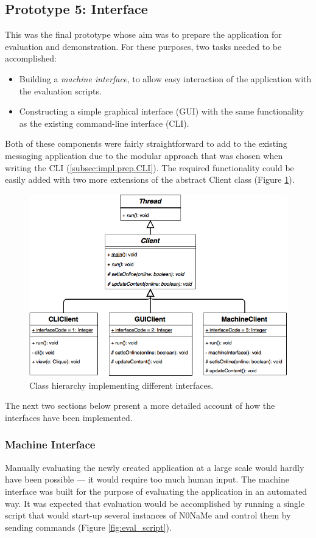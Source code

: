 \documentclass[a4paper, 12pt]{report}
\newcommand{\funkytt}{\fontfamily{AnonymousPro}\selectfont}
\begin{document}
\subsection{Prototype 5: Interface}
\label{subsec:impl.proto.interface}
This was the final prototype whose aim was to prepare the application for evaluation and demonstration. For these purposes, two tasks needed to be accomplished:
\begin{itemize}
    \item Building a \emph{machine interface}, to allow easy interaction of the application with the evaluation scripts.
    \item Constructing a simple graphical interface (GUI) with the same functionality as the existing command-line interface (CLI).
\end{itemize}

Both of these components were fairly straightforward to add to the existing messaging application due to the modular approach that was chosen when writing the CLI (\cref{subsec:impl.prep.CLI}). The required functionality could be easily added with two more extensions of the abstract Client class (Figure \ref{fig:Client_UI}).

\begin{figure}[H]
    \captionsetup{width=0.80\textwidth}
    \centering
    \includegraphics[width=0.76\linewidth]{pics/Client_UI.png}
    \caption{\label{fig:Client_UI} Class hierarchy implementing different interfaces.}
\end{figure}
The next two sections below present a more detailed account of how the interfaces have been implemented.

\subsubsection{Machine Interface}
Manually evaluating the newly created application at a large scale would hardly have been possible --- it would require too much human input. The machine interface was built for the purpose of evaluating the application in an automated way. It was expected that evaluation would be accomplished by running a single script that would start-up several instances of {\funkytt N0NaMe} and control them by sending commands (Figure \ref{fig:eval_script}).
\end{document}
